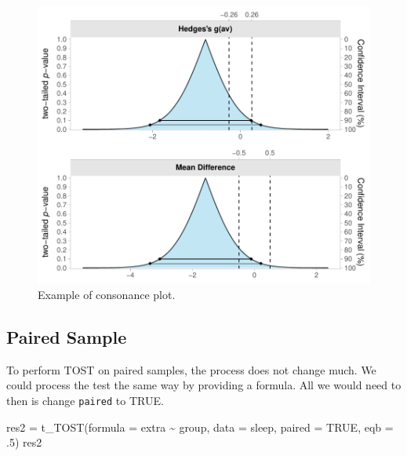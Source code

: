 \documentclass[
]{interact}
\newenvironment{Shaded}{\begin{snugshade}}{\end{snugshade}}
\newcommand{\AttributeTok}[1]{\textcolor[rgb]{0.40,0.45,0.13}{#1}}
\newcommand{\ConstantTok}[1]{\textcolor[rgb]{0.56,0.35,0.01}{#1}}
\newcommand{\DecValTok}[1]{\textcolor[rgb]{0.68,0.00,0.00}{#1}}
\newcommand{\FunctionTok}[1]{\textcolor[rgb]{0.28,0.35,0.67}{#1}}
\newcommand{\NormalTok}[1]{\textcolor[rgb]{0.00,0.23,0.31}{#1}}
\newcommand{\OtherTok}[1]{\textcolor[rgb]{0.00,0.23,0.31}{#1}}
\newcommand{\SpecialCharTok}[1]{\textcolor[rgb]{0.37,0.37,0.37}{#1}}
\begin{document}
\begin{figure}[H]

{\centering \includegraphics{avocado-quarto_files/figure-pdf/conplot-1.pdf}

}

\caption{Example of consonance plot.}

\end{figure}

\newpage

\hypertarget{paired-sample}{%
\subsection{Paired Sample}\label{paired-sample}}

To perform TOST on paired samples, the process does not change much. We
could process the test the same way by providing a formula. All we would
need to then is change \texttt{paired} to TRUE.

\begin{Shaded}
\begin{Highlighting}[]
\NormalTok{res2 }\OtherTok{=} \FunctionTok{t\_TOST}\NormalTok{(}\AttributeTok{formula =}\NormalTok{ extra }\SpecialCharTok{\textasciitilde{}}\NormalTok{ group,}
              \AttributeTok{data =}\NormalTok{ sleep,}
              \AttributeTok{paired =} \ConstantTok{TRUE}\NormalTok{,}
              \AttributeTok{eqb =}\NormalTok{ .}\DecValTok{5}\NormalTok{)}
\NormalTok{res2}
\end{Highlighting}
\end{Shaded}
\end{document}
